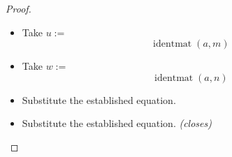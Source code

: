 \documentclass[11pt]{article}
\theoremstyle{plain}
\begin{document}
\begin{proof}
\begin{itemize}[leftmargin=2.8em, itemsep=4pt, parsep=1pt]
  \item[\textbf{9}] Take $u :=$
\begin{equation*}
\operatorname{identmat}(a, m)
\end{equation*}

  \item[\textbf{10--11}] Take $w :=$
\begin{equation*}
\operatorname{identmat}(a, n)
\end{equation*}

  \item[\textbf{12--13}] Substitute the established equation.
  \item[\textbf{14--15}] Substitute the established equation.  \emph{(closes)}
\end{itemize}
\end{proof}
\end{document}

